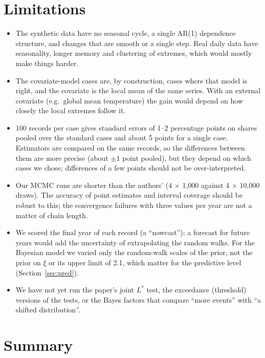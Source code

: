 \documentclass[11pt]{article}
\begin{document}
\section{Limitations}

\begin{itemize}
\item The synthetic data have no seasonal cycle, a single AR(1) dependence structure, and changes
  that are smooth or a single step. Real daily data have seasonality, longer memory and
  clustering of extremes, which would mostly make things harder.
\item The covariate-model cases are, by construction, cases where that model is right, and the
  covariate is the local mean of the same series. With an external covariate (e.g.\ global mean
  temperature) the gain would depend on how closely the local extremes follow it.
\item 100 records per case gives standard errors of 1--2 percentage points on shares pooled over
  the standard cases and about 5 points for a single case. Estimators are compared on the same records,
  so the differences between them are more precise (about $\pm1$ point pooled), but they depend on
  which cases we chose; differences of a few points should not be over-interpreted.
\item Our MCMC runs are shorter than the authors' (4 $\times$ 1,000 against 4 $\times$ 10,000
  draws). The accuracy of point estimates and interval coverage should be robust to this; the
  convergence failures with three values per year are not a matter of chain length.
\item We scored the final year of each record (a ``nowcast''); a forecast for future years would
  add the uncertainty of extrapolating the random walks. For the Bayesian model we varied only the
  random-walk scales of the prior, not the prior on $\xi$ or its upper limit of 2.1, which matter
  for the predictive level (Section~\ref{sec:pred}).
\item We have not yet run the paper's joint $L^*$ test, the exceedance (threshold) versions of
  the tests, or the Bayes factors that compare ``more events'' with ``a shifted distribution''.
\end{itemize}

\section{Summary}\label{sec:summary}
\end{document}
